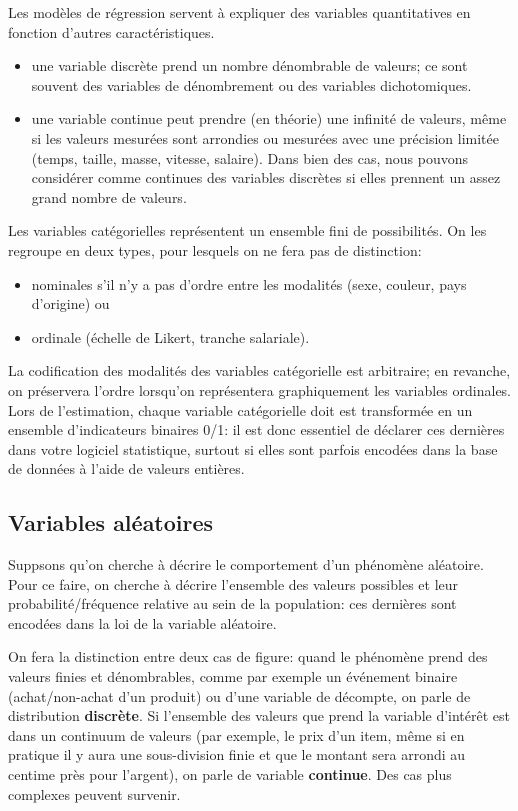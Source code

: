 \documentclass[
  11pt,
  letterpaper,
]{scrbook}
\providecommand{\tightlist}{%
  \setlength{\itemsep}{0pt}\setlength{\parskip}{0pt}}\usepackage{longtable,booktabs,array}
\theoremstyle{definition}
\theoremstyle{definition}
\theoremstyle{remark}
\begin{document}
Les modèles de régression servent à expliquer des variables
quantitatives en fonction d'autres caractéristiques.

\begin{itemize}
\tightlist
\item
  une variable discrète prend un nombre dénombrable de valeurs; ce sont
  souvent des variables de dénombrement ou des variables dichotomiques.
\item
  une variable continue peut prendre (en théorie) une infinité de
  valeurs, même si les valeurs mesurées sont arrondies ou mesurées avec
  une précision limitée (temps, taille, masse, vitesse, salaire). Dans
  bien des cas, nous pouvons considérer comme continues des variables
  discrètes si elles prennent un assez grand nombre de valeurs.
\end{itemize}

Les variables catégorielles représentent un ensemble fini de
possibilités. On les regroupe en deux types, pour lesquels on ne fera
pas de distinction:

\begin{itemize}
\tightlist
\item
  nominales s'il n'y a pas d'ordre entre les modalités (sexe, couleur,
  pays d'origine) ou
\item
  ordinale (échelle de Likert, tranche salariale).
\end{itemize}

La codification des modalités des variables catégorielle est arbitraire;
en revanche, on préservera l'ordre lorsqu'on représentera graphiquement
les variables ordinales. Lors de l'estimation, chaque variable
catégorielle doit est transformée en un ensemble d'indicateurs binaires
0/1: il est donc essentiel de déclarer ces dernières dans votre logiciel
statistique, surtout si elles sont parfois encodées dans la base de
données à l'aide de valeurs entières.

\subsection{Variables aléatoires}\label{variable-aleatoire}

Suppsons qu'on cherche à décrire le comportement d'un phénomène
aléatoire. Pour ce faire, on cherche à décrire l'ensemble des valeurs
possibles et leur probabilité/fréquence relative au sein de la
population: ces dernières sont encodées dans la loi de la variable
aléatoire.

On fera la distinction entre deux cas de figure: quand le phénomène
prend des valeurs finies et dénombrables, comme par exemple un événement
binaire (achat/non-achat d'un produit) ou d'une variable de décompte, on
parle de distribution \textbf{discrète}. Si l'ensemble des valeurs que
prend la variable d'intérêt est dans un continuum de valeurs (par
exemple, le prix d'un item, même si en pratique il y aura une
sous-division finie et que le montant sera arrondi au centime près pour
l'argent), on parle de variable \textbf{continue}. Des cas plus
complexes peuvent survenir.
\end{document}
